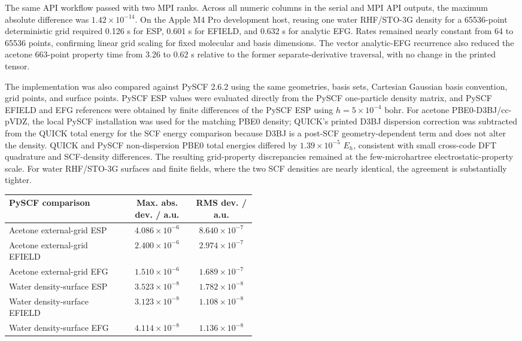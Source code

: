\documentclass[journal=jcisd8,manuscript=article]{achemso}
\begin{document}
The same API workflow passed with two MPI ranks.  Across all numeric columns in the serial and MPI API outputs, the maximum absolute difference was \(1.42\times10^{-14}\).  On the Apple M4 Pro development host, reusing one water RHF/STO-3G density for a 65536-point deterministic grid required 0.126 s for ESP, 0.601 s for EFIELD, and 0.632 s for analytic EFG.  Rates remained nearly constant from 64 to 65536 points, confirming linear grid scaling for fixed molecular and basis dimensions.  The vector analytic-EFG recurrence also reduced the acetone 663-point property time from 3.26 to 0.62 s relative to the former separate-derivative traversal, with no change in the printed tensor.

The implementation was also compared against PySCF 2.6.2 using the same geometries, basis sets, Cartesian Gaussian basis convention, grid points, and surface points.  PySCF ESP values were evaluated directly from the PySCF one-particle density matrix, and PySCF EFIELD and EFG references were obtained by finite differences of the PySCF ESP using \(h=5\times10^{-4}\) bohr.  For acetone PBE0-D3BJ/cc-pVDZ, the local PySCF installation was used for the matching PBE0 density; QUICK's printed D3BJ dispersion correction was subtracted from the QUICK total energy for the SCF energy comparison because D3BJ is a post-SCF geometry-dependent term and does not alter the density.  QUICK and PySCF non-dispersion PBE0 total energies differed by \(1.39\times10^{-5}\) \(E_h\), consistent with small cross-code DFT quadrature and SCF-density differences.  The resulting grid-property discrepancies remained at the few-microhartree electrostatic-property scale.  For water RHF/STO-3G surfaces and finite fields, where the two SCF densities are nearly identical, the agreement is substantially tighter.

\begin{center}
\small
\begin{tabular}{p{0.48\linewidth}cc}
\toprule
PySCF comparison & Max. abs. dev. / a.u. & RMS dev. / a.u. \\
\midrule
Acetone external-grid ESP & \(4.086\times10^{-6}\) & \(8.640\times10^{-7}\) \\
Acetone external-grid EFIELD & \(2.400\times10^{-6}\) & \(2.974\times10^{-7}\) \\
Acetone external-grid EFG & \(1.510\times10^{-6}\) & \(1.689\times10^{-7}\) \\
Water density-surface ESP & \(3.523\times10^{-8}\) & \(1.782\times10^{-8}\) \\
Water density-surface EFIELD & \(3.123\times10^{-8}\) & \(1.108\times10^{-8}\) \\
Water density-surface EFG & \(4.114\times10^{-8}\) & \(1.136\times10^{-8}\) \\
\bottomrule
\end{tabular}
\end{center}
\end{document}
